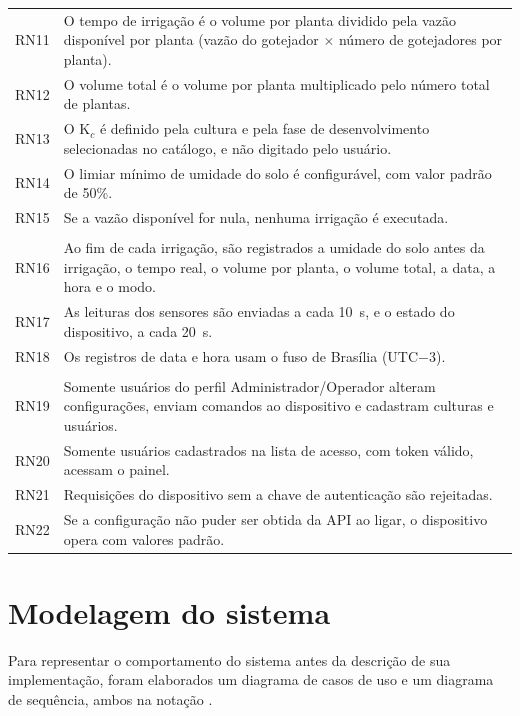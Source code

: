 {\begin{longtable}{>{\raggedright\arraybackslash}p{1.2cm}
                  >{\raggedright\arraybackslash}p{13.4cm}}
  RN11 & O tempo de irrigação é o volume por planta dividido pela vazão disponível por planta (vazão do gotejador $\times$ número de gotejadores por planta). \\
  RN12 & O volume total é o volume por planta multiplicado pelo número total de plantas. \\
  RN13 & O K$_c$ é definido pela cultura e pela fase de desenvolvimento selecionadas no catálogo, e não digitado pelo usuário. \\
  RN14 & O limiar mínimo de umidade do solo é configurável, com valor padrão de 50\%. \\
  RN15 & Se a vazão disponível for nula, nenhuma irrigação é executada. \\
  \hline
  \multicolumn{2}{l}{\textbf{Registro dos dados}} \\
  \hline
  RN16 & Ao fim de cada irrigação, são registrados a umidade do solo antes da irrigação, o tempo real, o volume por planta, o volume total, a data, a hora e o modo. \\
  RN17 & As leituras dos sensores são enviadas a cada 10~s, e o estado do dispositivo, a cada 20~s. \\
  RN18 & Os registros de data e hora usam o fuso de Brasília (UTC$-$3). \\
  \hline
  \multicolumn{2}{l}{\textbf{Acesso, integração e resiliência}} \\
  \hline
  RN19 & Somente usuários do perfil Administrador/Operador alteram configurações, enviam comandos ao dispositivo e cadastram culturas e usuários. \\
  RN20 & Somente usuários cadastrados na lista de acesso, com token válido, acessam o painel. \\
  RN21 & Requisições do dispositivo sem a chave de autenticação são rejeitadas. \\
  RN22 & Se a configuração não puder ser obtida da API ao ligar, o dispositivo opera com valores padrão. \\
\end{longtable}
}
\vspace{-0.8\baselineskip}

\section{Modelagem do sistema}
\label{sec:modelagem}

Para representar o comportamento do sistema antes da descrição de sua implementação, foram elaborados um diagrama de casos de uso e um diagrama de sequência, ambos na notação .

